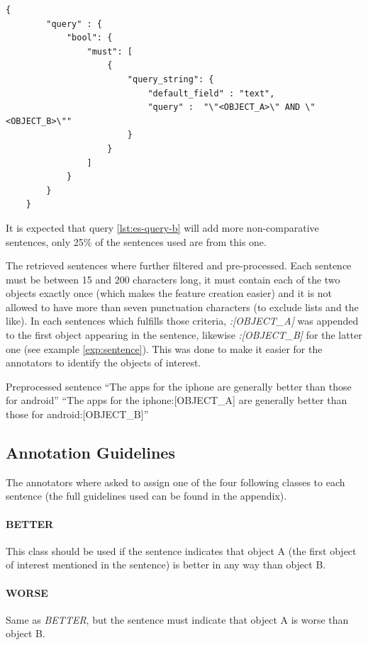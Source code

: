 \begin{lstlisting}[label=lst:es-query-b,breaklines=true,postbreak=\mbox{\textcolor{red}{$\hookrightarrow$}\space}]
  {
        "query" : {
            "bool": {
                "must": [
                    {
                        "query_string": {
                            "default_field" : "text",
                            "query" :  "\"<OBJECT_A>\" AND \"<OBJECT_B>\""
                        }
                    }
                ]
            }
        }
    }
\end{lstlisting}

It is expected that query \ref{lst:es-query-b}  will add more non-comparative sentences, only 25\% of the sentences used are from this one.

The retrieved sentences where further filtered and pre-processed. Each sentence must be between 15 and 200 characters long, it must contain each of the two objects exactly once (which makes the feature creation easier) and it is not allowed to have more than seven punctuation characters (to exclude lists and the like). In each sentences which fulfills those criteria, \emph{:[OBJECT\_A]} was appended to the first object appearing in the sentence, likewise \emph{:[OBJECT\_B]} for the latter one (see example \ref{exp:sentence}). This was done to make it easier for the annotators to identify the objects of interest.

\begin{ebox}{Preprocessed sentence}
\label{exp:sentence}
\enquote{The apps for the iphone are generally better than those for android}
\tcblower
\enquote{The apps for the iphone:[OBJECT\_A] are generally better than those for android:[OBJECT\_B]}
\end{ebox}


\subsection{Annotation Guidelines}
The annotators where asked to assign one of the four following classes to each sentence (the full guidelines used can be found in the appendix).

\paragraph{BETTER} This class should be used if the sentence indicates that object A (the first object of interest mentioned in the sentence) is better in any way than object B.

\paragraph{WORSE} Same as \emph{BETTER}, but the sentence must indicate that object A is worse than object B.
